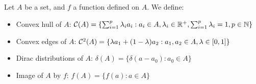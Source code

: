 \subsection{}
\label{sec:proof_pi_hull}
\begin{definition}
Let $A$ be a set, and $f$ a function defined on $A$. We define:

\begin{itemize}
    \item Convex hull of $A$: $\mathcal{C}(A) = \{\sum_{i=1}^p \lambda_i a_i: a_i\in A, \lambda_i\in\mathbb{R}^+, \sum_{i=1}^p \lambda_i = 1, p\in\mathbb{N}\}$
    \item Convex edges of $A$: $\mathcal{C}^2(A) = \{\lambda a_1 + (1-\lambda)a_2: a_1, a_2\in A, \lambda\in[0, 1]\}$
    \item Dirac distributions of $A$: $\delta(A) = \{\delta(a-a_0): a_0\in A\}$ 
    \item Image of $A$ by $f$: $f(A) = \{f(a): a\in A\}$
\end{itemize}
\end{definition}

